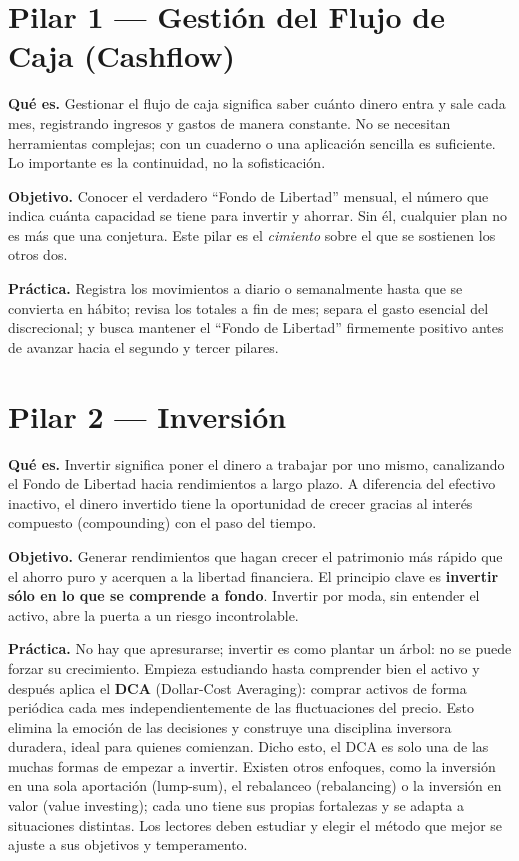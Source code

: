 \documentclass[10pt,a4paper,twocolumn]{article}
\begin{document}
\section{Pilar 1 --- Gesti\'on del Flujo de Caja (Cashflow)}
\textbf{Qu\'e es.} Gestionar el flujo de caja significa saber cu\'anto dinero entra y sale cada mes, registrando ingresos y gastos de manera constante. No se necesitan herramientas complejas; con un cuaderno o una aplicaci\'on sencilla es suficiente. Lo importante es la continuidad, no la sofisticaci\'on.

\textbf{Objetivo.} Conocer el verdadero ``Fondo de Libertad'' mensual, el n\'umero que indica cu\'anta capacidad se tiene para invertir y ahorrar. Sin \'el, cualquier plan no es m\'as que una conjetura. Este pilar es el \textit{cimiento} sobre el que se sostienen los otros dos.

\textbf{Pr\'actica.} Registra los movimientos a diario o semanalmente hasta que se convierta en h\'abito; revisa los totales a fin de mes; separa el gasto esencial del discrecional; y busca mantener el ``Fondo de Libertad'' firmemente positivo antes de avanzar hacia el segundo y tercer pilares.

\section{Pilar 2 --- Inversi\'on}
\textbf{Qu\'e es.} Invertir significa poner el dinero a trabajar por uno mismo, canalizando el Fondo de Libertad hacia rendimientos a largo plazo. A diferencia del efectivo inactivo, el dinero invertido tiene la oportunidad de crecer gracias al inter\'es compuesto (compounding) con el paso del tiempo.

\textbf{Objetivo.} Generar rendimientos que hagan crecer el patrimonio m\'as r\'apido que el ahorro puro y acerquen a la libertad financiera. El principio clave es \textbf{invertir s\'olo en lo que se comprende a fondo}. Invertir por moda, sin entender el activo, abre la puerta a un riesgo incontrolable.

\textbf{Pr\'actica.} No hay que apresurarse; invertir es como plantar un \'arbol: no se puede forzar su crecimiento. Empieza estudiando hasta comprender bien el activo y despu\'es aplica el \textbf{DCA} (Dollar-Cost Averaging): comprar activos de forma peri\'odica cada mes independientemente de las fluctuaciones del precio. Esto elimina la emoci\'on de las decisiones y construye una disciplina inversora duradera, ideal para quienes comienzan. Dicho esto, el DCA es solo una de las muchas formas de empezar a invertir. Existen otros enfoques, como la inversi\'on en una sola aportaci\'on (lump-sum), el rebalanceo (rebalancing) o la inversi\'on en valor (value investing); cada uno tiene sus propias fortalezas y se adapta a situaciones distintas. Los lectores deben estudiar y elegir el m\'etodo que mejor se ajuste a sus objetivos y temperamento.
\end{document}
